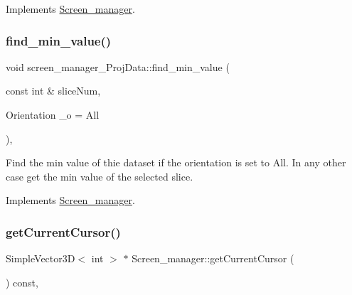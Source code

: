 Implements \mbox{\hyperlink{classScreen__manager}{Screen\+\_\+manager}}.

\mbox{\label{classscreen__manager__ProjData_aafc7c0ce08eb4870d885e8f4a2596e88}} 
\subsubsection{\texorpdfstring{find\+\_\+min\+\_\+value()}{find\_min\_value()}}
{\footnotesize\ttfamily void screen\+\_\+manager\+\_\+\+Proj\+Data\+::find\+\_\+min\+\_\+value (\begin{DoxyParamCaption}\item[{const int \&}]{slice\+Num,  }\item[{Orientation}]{\+\_\+o = {\ttfamily All} }\end{DoxyParamCaption})\hspace{0.3cm}{\ttfamily [protected]}, {\ttfamily [virtual]}}

Find the min value of thie dataset if the orientation is set to All. In any other case get the min value of the selected slice. 

Implements \mbox{\hyperlink{classScreen__manager}{Screen\+\_\+manager}}.

\mbox{\label{classScreen__manager_a86a2c051954195c03f8718f4e371c221}} 
\subsubsection{\texorpdfstring{get\+Current\+Cursor()}{getCurrentCursor()}\hspace{0.1cm}{\footnotesize\ttfamily [1/2]}}
{\footnotesize\ttfamily Simple\+Vector3D$<$ int $>$ $\ast$ Screen\+\_\+manager\+::get\+Current\+Cursor (\begin{DoxyParamCaption}{ }\end{DoxyParamCaption}) const\hspace{0.3cm}{\ttfamily [inline]}, {\ttfamily [inherited]}}

